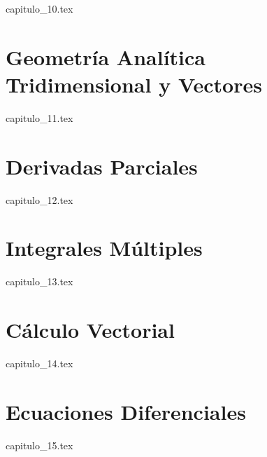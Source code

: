 \documentclass[11pt,spanish,oneside]{book}
\begin{document}
{capitulo_10.tex}

\part{Geometría Analítica Tridimensional y Vectores}

{capitulo_11.tex}

\part{Derivadas Parciales}

{capitulo_12.tex}

\part{Integrales Múltiples}

{capitulo_13.tex}

\part{Cálculo Vectorial}

{capitulo_14.tex}

\part{Ecuaciones Diferenciales}

{capitulo_15.tex}
\end{document}
